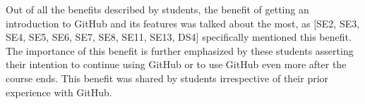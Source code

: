 Out of all the benefits described by students, the benefit of getting an introduction to GitHub and its features was talked about the most, as [SE2, SE3, SE4, SE5, SE6, SE7, SE8, SE11, SE13, DS4] specifically mentioned this benefit. The importance of this benefit is further emphasized by these students asserting their intention to continue using GitHub or to use GitHub even more after the course ends. This benefit was shared by students irrespective of their prior experience with GitHub. \\





